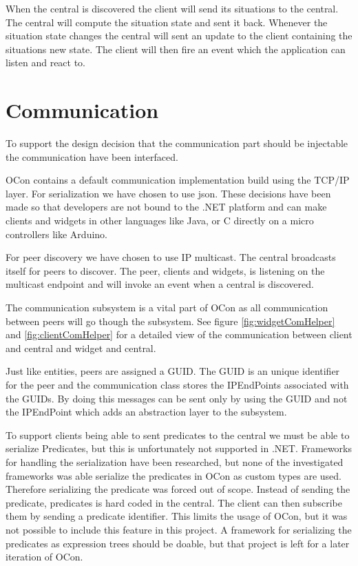 \documentclass[../report.tex]{subfiles}
\begin{document}
When the central is discovered the client will send its situations to the central. The central will compute the situation state and sent it back. Whenever the situation state changes the central will sent an update to the client containing the situations new state. The client will then fire an event which the application can listen and react to.

\section{Communication}

To support the design decision that the communication part should be injectable the communication have been interfaced.

OCon contains a default communication implementation build using the TCP/IP layer. For serialization we have chosen to use json. These decisions have been made so that developers are not bound to the .NET platform and can make clients and widgets in other languages like Java, or C directly on a micro controllers like Arduino.

For peer discovery we have chosen to use IP multicast. The central broadcasts itself for peers to discover. The peer, clients and widgets, is listening on the multicast endpoint and will invoke an event when a central is discovered.

The communication subsystem is a vital part of OCon as all communication between peers will go though the subsystem. See figure \ref{fig:widgetComHelper} and \ref{fig:clientComHelper} for a detailed view of the communication between client and central and widget and central.

Just like entities, peers are assigned a GUID. The GUID is an unique identifier for the peer and the communication class stores the IPEndPoints associated with the GUIDs. By doing this messages can be sent only by using the GUID and not the IPEndPoint which adds an abstraction layer to the subsystem.

To support clients being able to sent predicates to the central we must be able to serialize Predicates, but this is unfortunately not supported in .NET. Frameworks for handling the serialization have been researched, but none of the investigated frameworks was able serialize the predicates in OCon as custom types are used. Therefore serializing the predicate was forced out of scope. Instead of sending the predicate, predicates is hard coded in the central. The client can then subscribe them by sending a predicate identifier. This limits the usage of OCon, but it was not possible to include this feature in this project. A framework for serializing the predicates as expression trees should be doable, but that project is left for a later iteration of OCon.
\end{document}
